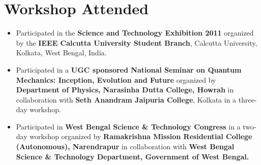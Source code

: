 \documentclass[11pt,a4paper,sans]{moderncv}        %
\begin{document}
\section{Workshop Attended}

\begin{itemize}
	\item{Participated in the \textbf{Science and Technology Exhibition 2011} organized by the \textbf{IEEE Calcutta University
		Student Branch}, Calcutta University, Kolkata, West Bengal, India.}
	
	\vspace{3pt}
	
	\item{Participated in a \textbf{UGC sponsored National Seminar on Quantum Mechanics: Inception, Evolution and Future} organized by \textbf{Department of Physics, Narasinha Dutta College, Howrah} in collaboration with \textbf{Seth Anandram Jaipuria College}, Kolkata in a three-day workshop.}
	
	\vspace{3pt}
	
	\item{Participated in\textbf{ West Bengal Science \& Technology Congress} in a two-day workshop organized by \textbf{Ramakrishna Mission Residential College (Autonomous), Narendrapur} in collaboration with \textbf{West Bengal Science \& Technology Department, Government of West Bengal.}}
\end{itemize}
\end{document}
